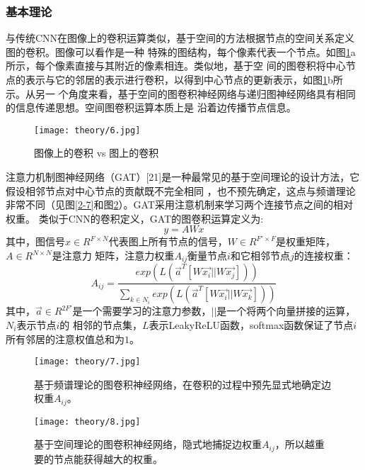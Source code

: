 \subsubsection{基本理论}
与传统CNN在图像上的卷积运算类似，基于空间的方法根据节点的空间关系定义图的卷积。图像可以看作是一种
特殊的图结构，每个像素代表一个节点。如图\ref{2-6}a所示，每个像素直接与其附近的像素相连。类似地，基于空
间的图卷积将中心节点的表示与它的邻居的表示进行卷积，以得到中心节点的更新表示，如图\ref{2-6}b所示。从另一
个角度来看，基于空间的图卷积神经网络与递归图神经网络具有相同的信息传递思想。空间图卷积运算本质上是
沿着边传播节点信息。

\begin{figure}[ht]
    \centering
    \texttt{[image: theory/6.jpg]}
    \caption{\label{2-6}图像上的卷积 vs 图上的卷积}
\end{figure}

注意力机制图神经网络（GAT）[21]是一种最常见的基于空间理论的设计方法，它假设相邻节点对中心节点的贡献既不完全相同
，也不预先确定，这点与频谱理论非常不同（见图\ref{2-7}和图\ref{2-8}）。GAT采用注意机制来学习两个连接节点之间的相对权重。
类似于CNN的卷积定义，GAT的图卷积运算定义为:
$$  y = A W x $$
其中，图信号$ x\in R^{F \times N} $代表图上所有节点的信号，$ W \in R^{F' \times F} $是权重矩阵，$A \in R^{N \times N}$是注意力
矩阵，注意力权重$A_{ij}$衡量节点$i$和它相邻节点$j$的连接权重：
$$
    A_{ij} = \frac{exp(L(\vec{a}^{T}[W\vec{x_{i}}||W\vec{x_{j}}]))}
    { {\textstyle \sum_{k\in N_{i} }^{}} exp(L(\vec{a}^{T}[W\vec{x_{i}}||W\vec{x_{k}}]))}  
$$
其中，$\vec{a} \in R^{2F'}$是一个需要学习的注意力参数，$ || $是一个将两个向量拼接的运算，$ N_{i} $表示节点$i$的
相邻的节点集，$L$表示LeakyReLU函数，softmax函数保证了节点$i$所有邻居的注意权值总和为$1$。

\begin{figure}[htbp]
    \centering
    \begin{minipage}[t]{0.48\textwidth}
    \centering
    \captionsetup{width=5cm}
    \texttt{[image: theory/7.jpg]}
    \caption{\label{2-7}基于频谱理论的图卷积神经网络，在卷积的过程中预先显式地确定边权重$A_{ij}$。}
    \end{minipage}
    \begin{minipage}[t]{0.48\textwidth}
    \centering
    \captionsetup{width=5cm}
    \texttt{[image: theory/8.jpg]}
    \caption{\label{2-8}基于空间理论的图卷积神经网络，隐式地捕捉边权重$A_{ij}$，所以越重要的节点能获得越大的权重。}
    \end{minipage}
\end{figure}

